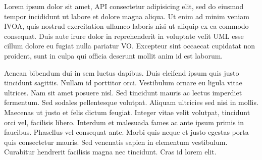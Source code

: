 Lorem ipsum dolor sit amet,  \ac{API}  consectetur adipisicing elit, sed do eiusmod tempor incididunt ut labore et dolore magna aliqua. Ut enim ad minim veniam \ac{IVOA}, quis nostrud exercitation ullamco laboris nisi ut aliquip ex ea commodo consequat. Duis aute irure dolor in reprehenderit in voluptate velit  \ac{UML}  esse cillum dolore eu fugiat nulla pariatur \ac{VO}. Excepteur sint occaecat cupidatat non proident, sunt in culpa qui officia deserunt mollit anim id est laborum. 


Aenean bibendum dui in sem luctus dapibus. Duis eleifend ipsum quis justo tincidunt sagittis. Nullam id porttitor orci. Vestibulum ornare eu ligula vitae ultrices. Nam sit amet posuere nisl. Sed tincidunt mauris ac lectus imperdiet fermentum. Sed sodales pellentesque volutpat. Aliquam ultricies sed nisi in mollis. Maecenas ut justo et felis dictum feugiat. Integer vitae velit volutpat, tincidunt orci vel, facilisis libero. Interdum et malesuada fames ac ante ipsum primis in faucibus. Phasellus vel consequat ante. Morbi quis neque et justo egestas porta quis consectetur mauris. Sed venenatis sapien in elementum vestibulum. Curabitur hendrerit facilisis magna nec tincidunt. Cras id lorem elit.
